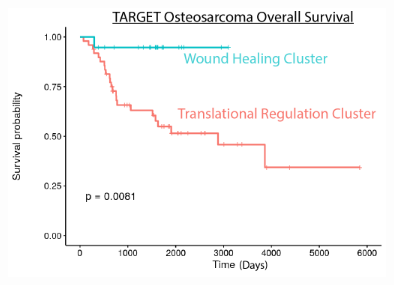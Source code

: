 \documentclass[10pt,letterpaper]{article}
\begin{document}
\begin{table}
	\ContinuedFloat
	
	\centering
	\includegraphics[width=0.75\textwidth]{img/osteo-kaplan-meier-2x}	
\end{table}

\FloatBarrier
\end{document}
